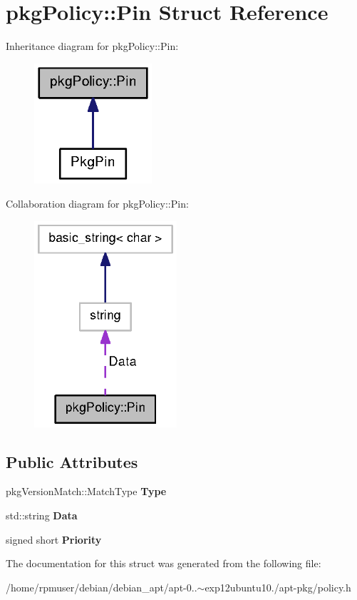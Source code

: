 \section{pkg\-Policy\-:\-:\-Pin \-Struct \-Reference}
\label{structpkgPolicy_1_1Pin}


\-Inheritance diagram for pkg\-Policy\-:\-:\-Pin\-:
\nopagebreak
\begin{figure}[H]
\begin{center}
\leavevmode
\includegraphics[width=124pt]{structpkgPolicy_1_1Pin__inherit__graph}
\end{center}
\end{figure}


\-Collaboration diagram for pkg\-Policy\-:\-:\-Pin\-:
\nopagebreak
\begin{figure}[H]
\begin{center}
\leavevmode
\includegraphics[width=150pt]{structpkgPolicy_1_1Pin__coll__graph}
\end{center}
\end{figure}
\subsection*{\-Public \-Attributes}
\begin{DoxyCompactItemize}
\item 
pkg\-Version\-Match\-::\-Match\-Type {\bfseries \-Type}\label{structpkgPolicy_1_1Pin_a572ae16d2249ef86abebb9a6bab60488}

\item 
std\-::string {\bfseries \-Data}\label{structpkgPolicy_1_1Pin_a25fcab7ba85ce007c5bd4fe39bbe7f6f}

\item 
signed short {\bfseries \-Priority}\label{structpkgPolicy_1_1Pin_a23bcec9c69f6a284c4e030165ccdac55}

\end{DoxyCompactItemize}


\-The documentation for this struct was generated from the following file\-:\begin{DoxyCompactItemize}
\item 
/home/rpmuser/debian/debian\-\_\-apt/apt-\/0..$\sim$exp12ubuntu10./apt-\/pkg/policy.\-h\end{DoxyCompactItemize}
